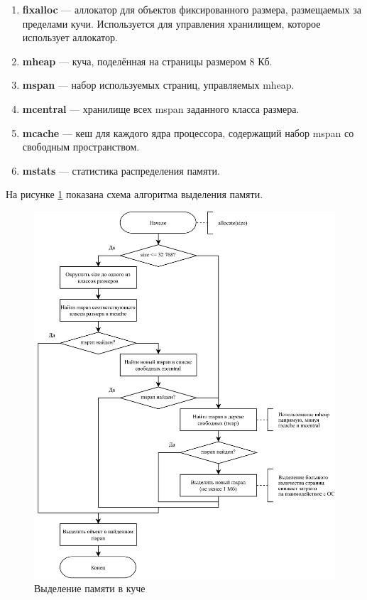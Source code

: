 \begin{enumerate}[label*=\arabic*.]
	\item \textbf{fixalloc} \cite{golang_fixalloc} --- аллокатор для объектов фиксированного размера, размещаемых за пределами кучи. Используется для управления хранилищем, которое использует аллокатор.
	\item \textbf{mheap} --- куча, поделённая на страницы размером 8 Кб.
	\item \textbf{mspan} --- набор используемых страниц, управляемых mheap.
	\item \textbf{mcentral} --- хранилище всех mspan заданного класса размера.
	\item \textbf{mcache} --- кеш для каждого ядра процессора, содержащий набор mspan со свободным пространством.
	\item \textbf{mstats} --- статистика распределения памяти.
\end{enumerate}

На рисунке \ref{fig:golang-allocate} показана схема алгоритма выделения памяти.

\begin{figure}[H]
	\centering
	\includegraphics[scale=0.175]{assets/golang-allocate.png}
	\caption{Выделение памяти в куче}
	\label{fig:golang-allocate}
\end{figure}

